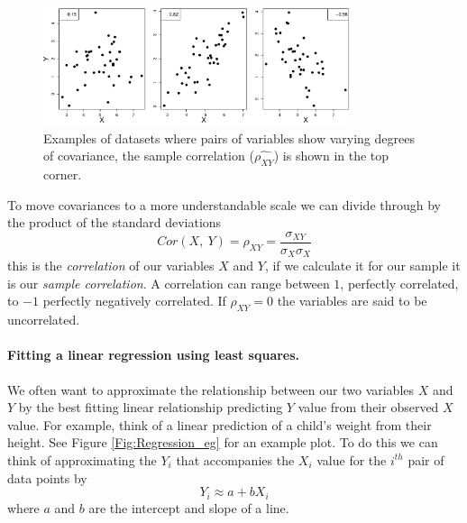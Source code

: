     \begin{figure}
 \begin{center}
   \includegraphics[width=0.8\textwidth]{math_background/dist_pics/Covar.pdf}\end{center}
 \caption{Examples of datasets where pairs of variables show varying
   degrees of covariance, the sample correlation ($ \widehat{\rho_{XY}}$) is shown in the top corner.
   }\label{Fig:Covar_egs}
 \end{figure}
To move covariances to a more understandable scale we can divide
through by the product of the standard deviations
\begin{equation}
Cor(X,~Y) =\rho_{XY} = \frac{{\sigma_{XY}}}{\sigma_{X} \sigma_{X}}  \label{eqn:def_corr}
\end{equation}
this is the \emph{correlation} of our variables $X$ and $Y$, if we
calculate it for our sample it is our \emph{sample correlation}. A correlation can range between $1$,
perfectly correlated, to $-1$ perfectly negatively correlated. If
$\rho_{XY} =0$ the variables are said to be uncorrelated.


\paragraph{Fitting a linear regression using least squares.}
We often want to approximate the relationship between our two variables
$X$ and $Y$ by the best fitting linear relationship predicting $Y$
value from their observed $X$
value. For example, think of a linear prediction of a child's weight from their height. 
See Figure \ref{Fig:Regression_eg} for an example plot. To do this we can think of approximating the $Y_i$ that
accompanies the $X_i$ value for the $i^{th}$ pair of data points by
\begin{equation}
Y_i \approx a+ b X_i \label{eqn:def_linear_regression}
\end{equation}
where $a$ and $b$ are the intercept and slope of a line.

